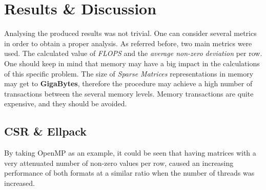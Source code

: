 \documentclass[12pt]{article}
\begin{document}
\section*{Results \& Discussion}

\par Analysing the produced results was not trivial. One can consider several metrics in order to obtain a proper analysis. As referred before, two main metrics were used. The calculated value of \textit{FLOPS} and the \textit{average non-zero deviation} per row. One should keep in mind that memory may have a big impact in the calculations of this specific problem. The size of \textit{Sparse Matrices} representations in memory may get to \textbf{GigaBytes}, therefore the procedure may achieve a high number of transactions between the several memory levels. Memory transactions are quite expensive, and they should be avoided.

\subsection*{CSR \& Ellpack}

\par By taking OpenMP as an example, it could be seen that  having matrices with a very attenuated number of non-zero values per row, caused an increasing performance of both formats at a similar ratio when the number of threads was increased.
\end{document}
